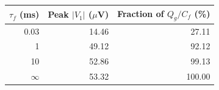\begin{tabular}{rrr}
\toprule
$\tau_f$ (ms) & Peak $|V_1|$ ($\mu$V) & Fraction of $Q_g/C_f$ (\%) \\
\midrule
0.03 & 14.46 & 27.11 \\
1 & 49.12 & 92.12 \\
10 & 52.86 & 99.13 \\
$\infty$ & 53.32 & 100.00 \\
\bottomrule
\end{tabular}
